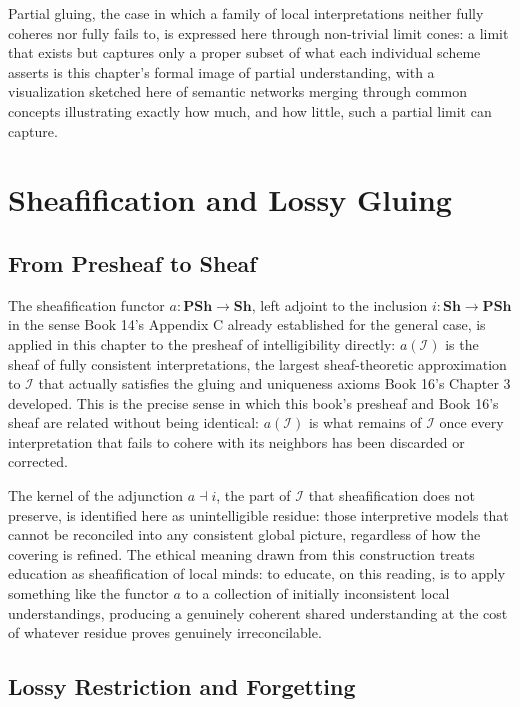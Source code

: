 Partial gluing, the case in which a family of local interpretations neither fully coheres nor fully fails to, is expressed here through non-trivial limit cones: a limit that exists but captures only a proper subset of what each individual scheme asserts is this chapter's formal image of partial understanding, with a visualization sketched here of semantic networks merging through common concepts illustrating exactly how much, and how little, such a partial limit can capture.

\part{Sheafification and Lossy Gluing}

\chapter{From Presheaf to Sheaf}

The sheafification functor $a: \mathbf{PSh} \to \mathbf{Sh}$, left adjoint to the inclusion $i: \mathbf{Sh} \to \mathbf{PSh}$ in the sense Book 14's Appendix C already established for the general case, is applied in this chapter to the presheaf of intelligibility directly: $a(\mathcal{I})$ is the sheaf of fully consistent interpretations, the largest sheaf-theoretic approximation to $\mathcal{I}$ that actually satisfies the gluing and uniqueness axioms Book 16's Chapter 3 developed. This is the precise sense in which this book's presheaf and Book 16's sheaf are related without being identical: $a(\mathcal{I})$ is what remains of $\mathcal{I}$ once every interpretation that fails to cohere with its neighbors has been discarded or corrected.

The kernel of the adjunction $a \dashv i$, the part of $\mathcal{I}$ that sheafification does not preserve, is identified here as unintelligible residue: those interpretive models that cannot be reconciled into any consistent global picture, regardless of how the covering is refined. The ethical meaning drawn from this construction treats education as sheafification of local minds: to educate, on this reading, is to apply something like the functor $a$ to a collection of initially inconsistent local understandings, producing a genuinely coherent shared understanding at the cost of whatever residue proves genuinely irreconcilable.

\chapter{Lossy Restriction and Forgetting}

